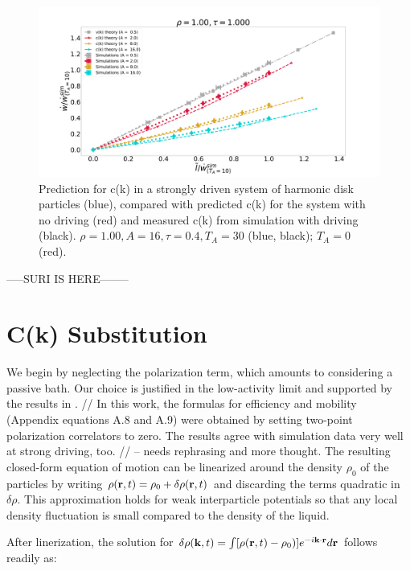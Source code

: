 \documentclass[amsmath,preprintnumbers,10pt,nofootinbib,prl,twocolumn]{revtex4-1}
\begin{document}

\begin{figure}
    \centering
    \includegraphics[scale=0.075, clip=True]{dW_tI_new_Suri_R1.00_U1.000.pdf}
    \caption{Prediction for c(k) in a strongly driven system of harmonic disk particles (blue), compared with predicted c(k) for the system with no driving (red) and measured c(k) from simulation with driving (black). $\rho = 1.00, A = 16, \tau = 0.4, T_A = 30$ (blue, black); $T_A = 0$ (red).}
    \label{Fig:2}
\end{figure}

-----SURI IS HERE--------
\section{C(k) Substitution}
We begin by neglecting the polarization term, which amounts to considering a passive bath. Our choice is justified in the low-activity limit and supported by the results in \cite{Suri2020}. // In this work, the formulas for efficiency and mobility (Appendix equations A.8 and A.9) were obtained by setting two-point polarization correlators to zero. The results agree with simulation data very well at strong driving, too. // -- needs rephrasing and more thought. The resulting closed-form equation of motion can be linearized around the density $\rho_0$ of the particles by writing $\rho ({\bf r}, t) = \rho_0 + \delta \rho({\bf r}, t)$ and discarding the terms quadratic in $\delta \rho$. This approximation holds for weak interparticle potentials so that any local density fluctuation is small compared to the density of the liquid. 

After linerization, the solution for $\delta \rho({\bf k}, t) = \int [ \rho({\bf r}, t) - \rho_0) ] e^{-i{\bf k} \cdot {\bf r}} d{\bf r}$ follows readily as:
\end{document}
